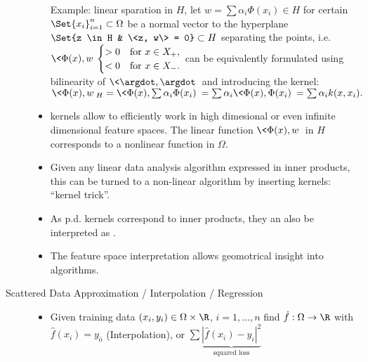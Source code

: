 \begin{description}
\begin{itemize}
                Example: linear sparation in $H$,
                let $w = \sum \alpha_i \Phi(x_i) \in H$ for certain $\Set{x_i}_{i=1}^n \subset \Omega$ be a normal vector to the hyperplane $\Set{z \in H & \<z, w\> = 0} \subset H$ separating the points, i.e.
                \begin{math}
                    \<\Phi(x), w\> \begin{cases}
                        > 0 & \text{for $x \in X_+$}, \\
                        < 0 & \text{for $x \in X_-$}.
                    \end{cases}
                \end{math}
                can be equivalently formulated using bilinearity of $\<\argdot, \argdot\>$ and introducing the kernel:
                \begin{math}
                    \<\Phi(x), w\>_H
                    = \<\Phi(x), \sum \alpha_i \Phi(x_i)\>
                    = \sum \alpha_i \<\Phi(x), \Phi(x_i)\>
                    = \sum \alpha_i k(x,x_i).
                \end{math}
            \item
                kernels allow to efficiently work in high dimesional or even infinite dimensional feature spaces.
                The linear function $\<\Phi(x), w\>$ in $H$ corresponds to a nonlinear function in $\Omega$.
            \item
                Given any linear data analysis algorithm expressed in inner products, this can be turned to a non-linear algorithm by inserting kernels: “kernel trick”.
            \item
                As p.d. kernels correspond to inner products, they an also be interpreted as .
            \item
                The feature space interpretation allows geomotrical insight into algorithms.
        \end{itemize}
    \item[Scattered Data Approximation / Interpolation / Regression]
        \begin{itemize}
            \item
                Given training data $(x_i, y_i) \in \Omega \times \R$, $i = 1, \dotsc, n$ find $\hat f: \Omega \to \R$ with $\hat f(x_i) = y_ö$ (Interpolation), or
                \begin{math}
                    \sum \underbrace{|\hat f(x_i) - y_i|^2}_{\text{squared loss}}

\end{math}
\end{itemize}
\end{description}
